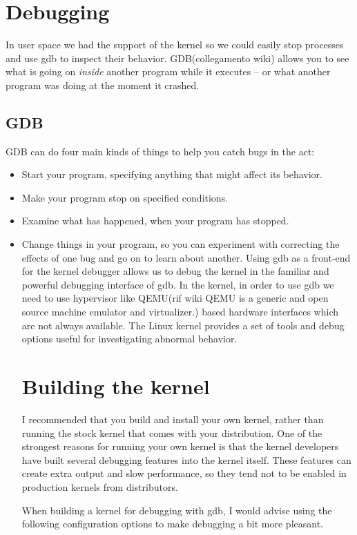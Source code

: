 \documentclass{masterthesis}
\begin{document}
\section{Debugging}
\label{sect:debugging}

In user space we had the support of the kernel so we could easily stop processes and use gdb to inspect their behavior.
GDB(collegamento wiki) allows you to see what is going on \emph{inside} another program while it executes -- or what another program was doing at the moment it crashed.
\subsection{GDB}
GDB can do four main kinds of things to help you catch bugs in the act:
\begin{itemize}
\item Start your program, specifying anything that might affect its behavior.
\item Make your program stop on specified conditions.
\item Examine what has happened, when your program has stopped.
\item Change things in your program, so you can experiment with correcting the effects of one bug and go on to learn about another.
Using gdb as a front-end for the kernel debugger allows us to debug the kernel in the familiar and powerful debugging interface of gdb.
In the kernel, in order to use gdb we need to use hypervisor like QEMU(rif wiki QEMU is a generic and open source machine emulator and virtualizer.) based hardware interfaces which are not always available.
The Linux kernel provides a set of tools and debug options useful for investigating abnormal behavior.

\section{Building the kernel}

I recommended that you build and install your own kernel, rather than running the stock kernel that comes with your distribution. One of the strongest reasons for running your own kernel is that the kernel developers have built several debugging features into the kernel itself. These features can create extra output and slow performance, so they tend not to be enabled in production kernels from distributors.

When building a kernel for debugging with gdb, I would advise using the following configuration options to make debugging a bit more pleasant.


\end{itemize}
\end{document}
